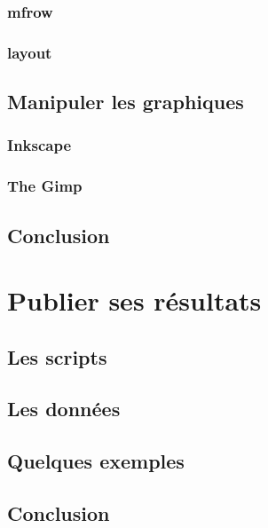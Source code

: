 \documentclass[]{book}
\theoremstyle{definition}
\theoremstyle{definition}
\theoremstyle{definition}
\theoremstyle{remark}
\begin{document}
\section{mfrow}\label{mfrow}

\section{layout}\label{layout}

\chapter{Manipuler les graphiques}\label{graph4}

\section{Inkscape}\label{inkscape}

\section{The Gimp}\label{the-gimp}

\chapter{Conclusion}\label{concluP2}

\part{Publier ses
résultats}\label{part-publier-ses-resultats}

\chapter{Les scripts}\label{p3script}

\chapter{Les données}\label{p3data}

\chapter{Quelques exemples}\label{p3example}

\chapter{Conclusion}\label{p3conclu}
\end{document}
